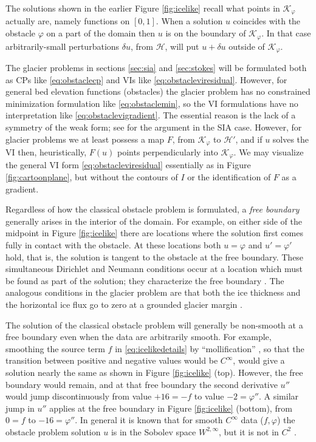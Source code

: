 \documentclass[letterpaper,final,12pt,reqno]{amsart}
\theoremstyle{claim}
\numberwithin{equation}{section}
\numberwithin{figure}{section}
\numberwithin{table}{section}
\numberwithin{theorem}{section}
\begin{document}
The solutions shown in the earlier Figure \ref{fig:icelike} recall what points in $\mathcal{K}_\varphi$ actually are, namely functions on $[0,1]$.  When a solution $u$ coincides with the obstacle $\varphi$ on a part of the domain then $u$ is on the boundary of $\mathcal{K}_\varphi$.  In that case arbitrarily-small perturbations $\delta u$, from $\mathcal{H}$, will put $u+\delta u$ outside of $\mathcal{K}_\varphi$.

The glacier problems in sections \ref{sec:sia} and \ref{sec:stokes} will be formulated both as CPs like \eqref{eq:obstaclecp} and VIs like \eqref{eq:obstacleviresidual}.  However, for general bed elevation functions (obstacles) the glacier problem has no constrained minimization formulation like \eqref{eq:obstaclemin}, so the VI formulations have no interpretation like \eqref{eq:obstaclevigradient}.  The essential reason is the lack of a symmetry of the weak form; see \cite{JouvetBueler2012} for the argument in the SIA case.  However, for glacier problems we at least possess a map $F$, from $\mathcal{K}_\varphi$ to $\mathcal{H}'$, and if $u$ solves the VI then, heuristically, $F(u)$ points perpendicularly into $\mathcal{K}_\varphi$.  We may visualize the general VI form \eqref{eq:obstacleviresidual} essentially as in Figure \ref{fig:cartoonplane}, but without the contours of $I$ or the identification of $F$ as a gradient.

Regardless of how the classical obstacle problem is formulated, a \emph{free boundary} generally arises in the interior of the domain.  For example, on either side of the midpoint in Figure \ref{fig:icelike} there are locations where the solution first comes fully in contact with the obstacle.  At these locations both $u=\varphi$ and $u'=\varphi'$ hold, that is, the solution is tangent to the obstacle at the free boundary.  These simultaneous Dirichlet and Neumann conditions occur at a location which must be found as part of the solution; they characterize the free boundary \cite[Chapter V]{KinderlehrerStampacchia1980}.  The analogous conditions in the glacier problem are that both the ice thickness and the horizontal ice flux go to zero at a grounded glacier margin \cite{Bueler2016,JouvetBueler2012}.

The solution of the classical obstacle problem will generally be non-smooth at a free boundary even when the data are arbitrarily smooth.  For example, smoothing the source term $f$ in \eqref{eq:icelikedetails} by ``mollification'' \cite{Evans2010}, so that the transition between positive and negative values would be $C^\infty$, would give a solution nearly the same as shown in Figure \ref{fig:icelike} (top).  However, the free boundary would remain, and at that free boundary the second derivative $u''$ would jump discontinuously from value $+16=-f$ to value $-2=\varphi''$.  A similar jump in $u''$ applies at the free boundary in Figure \ref{fig:icelike} (bottom), from $0=f$ to $-16=\varphi''$.  In general it is known that for smooth $C^\infty$ data ($f,\varphi$) the obstacle problem solution $u$ is in the Sobolev space $W^{2,\infty}$, but it is not in $C^2$ \cite[section IV.6]{KinderlehrerStampacchia1980}.
\end{document}
